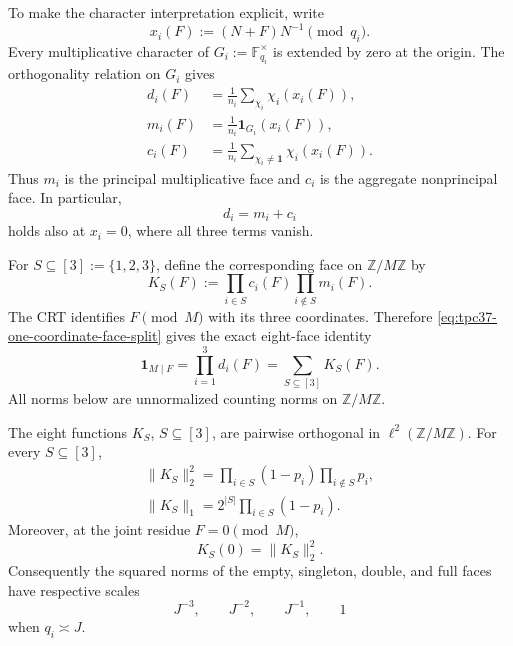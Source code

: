 To make the character interpretation explicit, write
\begin{equation}
 x_i(F):=(N+F)N^{-1}\pmod {q_i}.
 \label{eq:tpc37-ratio-coordinate}
\end{equation}
Every multiplicative character of
\(G_i:=\mathbb F_{q_i}^{\times}\) is extended by zero at the origin.  The
orthogonality relation on \(G_i\) gives
\begin{align}
 d_i(F)
 &=\frac1{n_i}\sum_{\chi_i}\chi_i(x_i(F)),
 \label{eq:tpc37-all-character-coordinate}\\
 m_i(F)
 &=\frac1{n_i}\mathbf 1_{G_i}(x_i(F)),
 \label{eq:tpc37-principal-character-coordinate}\\
 c_i(F)
 &=\frac1{n_i}\sum_{\chi_i\ne\mathbf 1}
 \chi_i(x_i(F)).
 \label{eq:tpc37-nonprincipal-character-coordinate}
\end{align}
Thus \(m_i\) is the principal multiplicative face and \(c_i\) is the
aggregate nonprincipal face.  In particular,
\begin{equation}
 d_i=m_i+c_i
 \label{eq:tpc37-one-coordinate-face-split}
\end{equation}
holds also at \(x_i=0\), where all three terms vanish.

For \(S\subseteq[3]:=\{1,2,3\}\), define the corresponding face on
\(\mathbb Z/M\mathbb Z\) by
\begin{equation}
 K_S(F)
 :=\prod_{i\in S}c_i(F)
   \prod_{i\notin S}m_i(F).
 \label{eq:tpc37-character-face}
\end{equation}
The CRT identifies \(F\pmod M\) with its three coordinates.  Therefore
\eqref{eq:tpc37-one-coordinate-face-split} gives the exact eight-face
identity
\begin{equation}
 \boxed{
 \mathbf 1_{M\mid F}
 =\prod_{i=1}^3d_i(F)
 =\sum_{S\subseteq[3]}K_S(F).}
 \label{eq:tpc37-eight-face-identity}
\end{equation}
All norms below are unnormalized counting norms on
\(\mathbb Z/M\mathbb Z\).

\begin{theorem}
\label{thm:tpc37-orthogonal-face-calculus}
The eight functions \(K_S\), \(S\subseteq[3]\), are pairwise orthogonal
in \(\ell^2(\mathbb Z/M\mathbb Z)\).  For every \(S\subseteq[3]\),
\begin{align}
 \boxed{
 \|K_S\|_2^2
 =\prod_{i\in S}(1-p_i)
  \prod_{i\notin S}p_i,}
 \label{eq:tpc37-face-l2}\\
 \boxed{
 \|K_S\|_1
 =2^{|S|}\prod_{i\in S}(1-p_i).}
 \label{eq:tpc37-face-l1}
\end{align}
Moreover, at the joint residue \(F=0\pmod M\),
\begin{equation}
 \boxed{
 K_S(0)=\|K_S\|_2^2.}
 \label{eq:tpc37-face-joint-value}
\end{equation}
Consequently the squared norms of the empty, singleton, double, and full
faces have respective scales
\begin{equation}
 J^{-3},\qquad J^{-2},\qquad J^{-1},\qquad 1
 \label{eq:tpc37-face-codimension-scales}
\end{equation}
when \(q_i\asymp J\).
\end{theorem}

